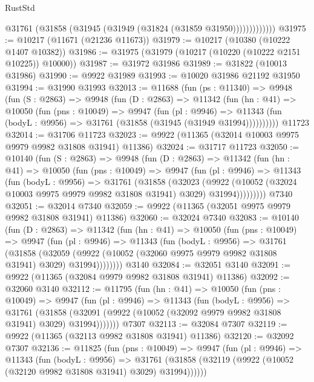\begin{lexlean}{RustStd}
\begin{coremodule}
                  @31761 (@31858 (@31945 (@31949 (@31824 (@31859 @31950)))))))))))))
@31975 := @10217 (@11671 (@21236 @11673))
@31979 := @10217 (@10380 (@10222 @1407 @10382))
@31986 := @31975 (@31979 (@10217 (@10220 (@10222 @2151 @10225)) @10000))
@31987 := @31972 @31986
@31989 := @31822 (@10013 @31986)
@31990 := @9922 @31989
@31993 := @10020 @31986 @21192 @31950
@31994 := @31990 @31993
@32013 := @11688
    (fun (ps : @11340) =>
    @9948
      (fun (S : @2863) =>
      @9948
        (fun (D : @2863) =>
        @11342
          (fun (hn : @41) =>
          @10050
            (fun (pns : @10049) =>
            @9947
              (fun (pl : @9946) =>
              @11343 (fun (bodyL : @9956) => @31761 (@31858 (@31945 (@31949 @31994))))))))))
    @11723
@32014 := @31706 @11723
@32023 := @9922 (@11365 (@32014 @10003 @9975 @9979 @9982 @31808 @31941) @11386)
@32024 := @31717 @11723
@32050 := @10140
    (fun (S : @2863) =>
    @9948
      (fun (D : @2863) =>
      @11342
        (fun (hn : @41) =>
        @10050
          (fun (pns : @10049) =>
          @9947
            (fun (pl : @9946) =>
            @11343
              (fun (bodyL : @9956) =>
              @31761
                (@31858
                  (@32023
                    (@9922
                      (@10052 (@32024 @10003 @9975 @9979 @9982 @31808 @31941) @3029)
                      @31994)))))))))
    @7340
@32051 := @32014 @7340
@32059 := @9922 (@11365 (@32051 @9975 @9979 @9982 @31808 @31941) @11386)
@32060 := @32024 @7340
@32083 := @10140
    (fun (D : @2863) =>
    @11342
      (fun (hn : @41) =>
      @10050
        (fun (pns : @10049) =>
        @9947
          (fun (pl : @9946) =>
          @11343
            (fun (bodyL : @9956) =>
            @31761
              (@31858
                (@32059
                  (@9922 (@10052 (@32060 @9975 @9979 @9982 @31808 @31941) @3029) @31994))))))))
    @3140
@32084 := @32051 @3140
@32091 := @9922 (@11365 (@32084 @9979 @9982 @31808 @31941) @11386)
@32092 := @32060 @3140
@32112 := @11795
    (fun (hn : @41) =>
    @10050
      (fun (pns : @10049) =>
      @9947
        (fun (pl : @9946) =>
        @11343
          (fun (bodyL : @9956) =>
          @31761
            (@31858 (@32091 (@9922 (@10052 (@32092 @9979 @9982 @31808 @31941) @3029) @31994)))))))
    @7307
@32113 := @32084 @7307
@32119 := @9922 (@11365 (@32113 @9982 @31808 @31941) @11386)
@32120 := @32092 @7307
@32136 := @11825
    (fun (pns : @10049) =>
    @9947
      (fun (pl : @9946) =>
      @11343
        (fun (bodyL : @9956) =>
        @31761 (@31858 (@32119 (@9922 (@10052 (@32120 @9982 @31808 @31941) @3029) @31994))))))

\end{coremodule}
\end{lexlean}
